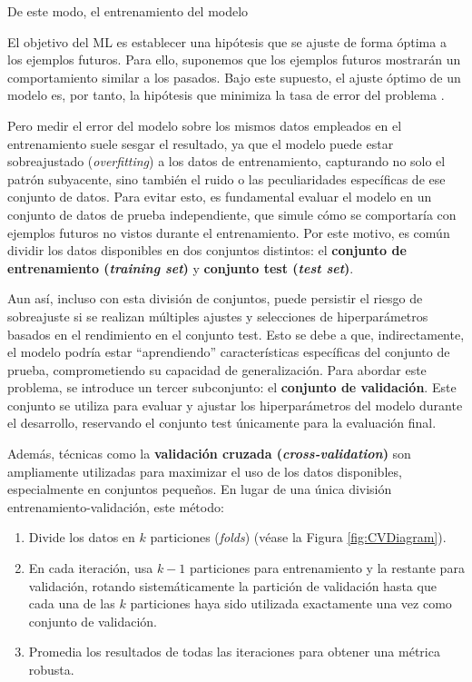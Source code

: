 De este modo, el entrenamiento del modelo








El objetivo del ML es establecer una hipótesis que se ajuste de forma óptima a los ejemplos futuros. Para 
ello, suponemos que los ejemplos futuros mostrarán un comportamiento similar a los pasados. Bajo este 
supuesto, el ajuste óptimo de un modelo es, por tanto, la hipótesis que minimiza la tasa de error del 
problema \cite{rusell2021}. 

Pero medir el error del modelo sobre los mismos datos empleados en el entrenamiento suele sesgar el resultado, 
ya que el modelo puede estar sobreajustado (\textit{overfitting}) a los datos de entrenamiento, capturando no 
solo el patrón subyacente, sino también el ruido o las peculiaridades específicas de ese conjunto de datos.
Para evitar esto, es fundamental evaluar el modelo en un conjunto de datos de prueba independiente, que simule 
cómo se comportaría con ejemplos futuros no vistos durante el entrenamiento. Por este motivo, es común dividir 
los datos disponibles en dos conjuntos distintos: el \textbf{conjunto de entrenamiento (\textit{training 
set})} y \textbf{conjunto test (\textit{test set})}.

Aun así, incluso con esta división de conjuntos, puede persistir el riesgo de sobreajuste si se realizan 
múltiples ajustes y selecciones de hiperparámetros basados en el rendimiento en el conjunto test.
Esto se debe a que, indirectamente, el modelo podría estar ``aprendiendo'' características específicas del 
conjunto de prueba, comprometiendo su capacidad de generalización. Para abordar este problema, se introduce 
un tercer subconjunto: el \textbf{conjunto de validación}. Este conjunto se utiliza para evaluar y ajustar 
los hiperparámetros del modelo durante el desarrollo, reservando el conjunto test únicamente para la 
evaluación final.

Además, técnicas como la \textbf{validación cruzada (\textit{cross-validation})} son ampliamente utilizadas 
para maximizar el uso de los datos disponibles, especialmente en conjuntos pequeños. En lugar de una única 
división entrenamiento-validación, este método:

\begin{enumerate}
    \item Divide los datos en $k$ particiones (\textit{folds}) (véase la Figura \ref{fig:CVDiagram}).
    \item En cada iteración, usa $k-1$ particiones para entrenamiento y la restante para validación, rotando
    sistemáticamente la partición de validación hasta que cada una de las $k$ particiones haya sido utilizada 
    exactamente una vez como conjunto de validación. 
    \item Promedia los resultados de todas las iteraciones para obtener una métrica robusta.
\end{enumerate}

